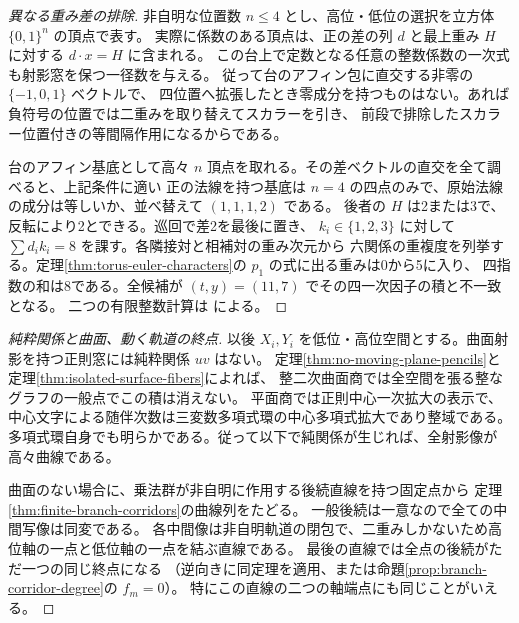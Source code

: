 \begin{proof}[異なる重み差の排除]
非自明な位置数 $n\le4$ とし、高位・低位の選択を立方体 $\{0,1\}^n$ の頂点で表す。
実際に係数のある頂点は、正の差の列 $d$ と最上重み $H$ に対する $d\cdot x=H$ に含まれる。
この台上で定数となる任意の整数係数の一次式も射影窓を保つ一径数を与える。
従って台のアフィン包に直交する非零の $\{-1,0,1\}$ ベクトルで、
四位置へ拡張したとき零成分を持つものはない。あれば負符号の位置では二重みを取り替えてスカラーを引き、
前段で排除したスカラー位置付きの等間隔作用になるからである。

台のアフィン基底として高々 $n$ 頂点を取れる。その差ベクトルの直交を全て調べると、上記条件に適い
正の法線を持つ基底は $n=4$ の四点のみで、原始法線の成分は等しいか、並べ替えて $(1,1,1,2)$ である。
後者の $H$ は2または3で、反転により2とできる。巡回で差2を最後に置き、
$k_i\in\{1,2,3\}$ に対して $\sum d_i k_i=8$ を課す。各隣接対と相補対の重み次元から
六関係の重複度を列挙する。定理\ref{thm:torus-euler-characters}の $p_1$ の式に出る重みは0から5に入り、
四指数の和は8である。全候補が $(t,y)=(11,7)$ でその四一次因子の積と不一致となる。
二つの有限整数計算は  による。
\end{proof}

\begin{proof}[純粋関係と曲面、動く軌道の終点]
以後 $X_i,Y_i$ を低位・高位空間とする。曲面射影を持つ正則窓には純粋関係 $u v$ はない。
定理\ref{thm:no-moving-plane-pencils}と定理\ref{thm:isolated-surface-fibers}によれば、
整二次曲面商では全空間を張る整なグラフの一般点でこの積は消えない。
平面商では正則中心一次拡大の表示で、中心文字による随伴次数は三変数多項式環の中心多項式拡大であり整域である。
多項式環自身でも明らかである。従って以下で純関係が生じれば、全射影像が高々曲線である。

曲面のない場合に、乗法群が非自明に作用する後続直線を持つ固定点から
定理\ref{thm:finite-branch-corridors}の曲線列をたどる。
一般後続は一意なので全ての中間写像は同変である。
各中間像は非自明軌道の閉包で、二重みしかないため高位軸の一点と低位軸の一点を結ぶ直線である。
最後の直線では全点の後続がただ一つの同じ終点になる
（逆向きに同定理を適用、または命題\ref{prop:branch-corridor-degree}の $f_m=0$）。
特にこの直線の二つの軸端点にも同じことがいえる。
\end{proof}

